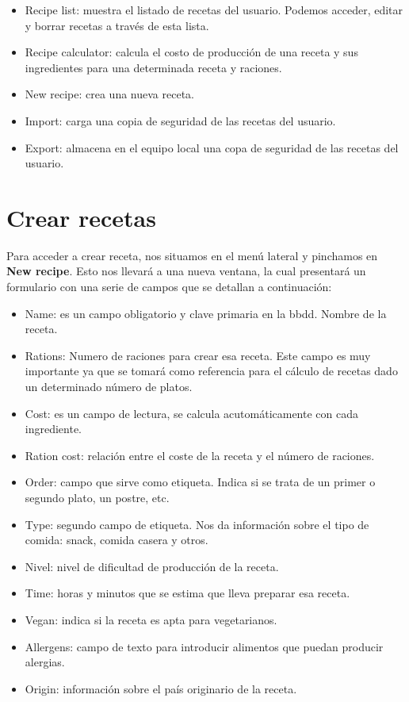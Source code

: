 \begin{itemize}
	\item Recipe list: muestra el listado de recetas del usuario. Podemos acceder, editar y borrar recetas a través de esta lista.
	\item Recipe calculator: calcula el costo de producción de una receta y sus ingredientes para una determinada receta y raciones.
	\item New recipe: crea una nueva receta.
	\item Import: carga una copia de seguridad de las recetas del usuario.
	\item Export: almacena en el equipo local una copa de seguridad de las recetas del usuario.
\end{itemize}


\vspace*{0.2in}
\section{Crear recetas}\label{cap.2.2}

Para acceder a crear receta, nos situamos en el menú lateral y pinchamos en \textbf{New recipe}. Esto nos llevará a una nueva ventana, la cual presentará un formulario con una serie de campos que se detallan a continuación:

\begin{itemize}
	\item Name: es un campo obligatorio y clave primaria en la bbdd. Nombre de la receta.
	\item Rations: Numero de raciones para crear esa receta. Este campo es muy importante ya que se tomará como referencia para el cálculo de recetas dado un determinado número de platos.
	\item Cost: es un campo de lectura, se calcula acutomáticamente con cada ingrediente.
	\item Ration cost: relación entre el coste de la receta y el número de raciones.
	\item Order: campo que sirve como etiqueta. Indica si se trata de un primer o segundo plato, un postre, etc.
	\item Type: segundo campo de etiqueta. Nos da información sobre el tipo de comida: snack, comida casera y otros.
	\item Nivel: nivel de dificultad de producción de la receta.
	\item Time: horas y minutos que se estima que lleva preparar esa receta.
	\item Vegan: indica si la receta es apta para vegetarianos.
	\item Allergens: campo de texto para introducir alimentos que puedan producir alergias.
	\item Origin: información sobre el país originario de la receta.
\end{itemize}

